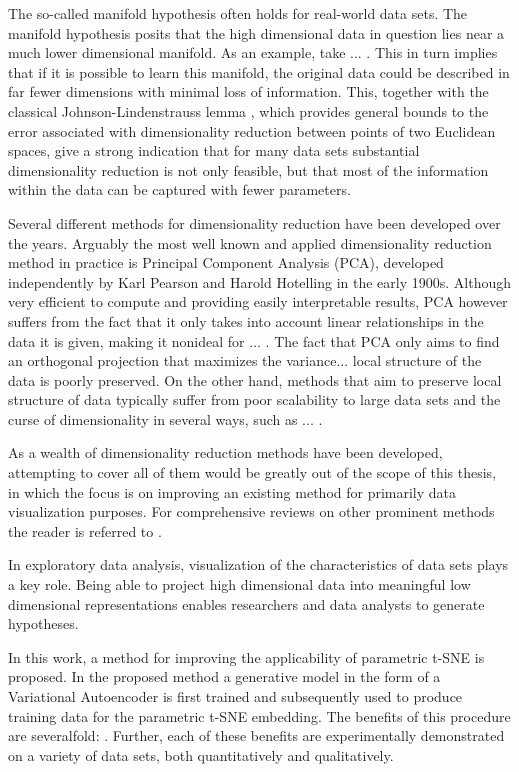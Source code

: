 The so-called manifold hypothesis \cite{manifold_hypothesis} often holds for real-world data sets. The manifold hypothesis posits that the high dimensional data in question lies near a much lower dimensional manifold. As an example, take ... . This in turn implies that if it is possible to learn this manifold, the original data could be described in far fewer dimensions with minimal loss of information. This, together with the classical Johnson-Lindenstrauss lemma \cite{johnson_lindenstrauss}, which provides general bounds to the error associated with dimensionality reduction between points of two Euclidean spaces, give a strong indication that for many data sets substantial dimensionality reduction is not only feasible, but that most of the information within the data can be captured with fewer parameters.

Several different methods for dimensionality reduction have been developed over the years. Arguably the most well known and applied dimensionality reduction method in practice is Principal Component Analysis (PCA), developed independently by Karl Pearson \cite{pca_1} and Harold Hotelling \cite{pca_2} in the early 1900s. Although very efficient to compute and providing easily interpretable results, PCA however suffers from the fact that it only takes into account linear relationships in the data it is given, making it nonideal for ... . The fact that PCA only aims to find an orthogonal projection that maximizes the variance... local structure of the data is poorly preserved. On the other hand, methods that aim to preserve local structure of data typically suffer from poor scalability to large data sets and the curse of dimensionality in several ways, such as ... .

As a wealth of dimensionality reduction methods have been developed, attempting to cover all of them would be greatly out of the scope of this thesis, in which the focus is on improving an existing method for primarily data visualization purposes. For comprehensive reviews on other prominent methods the reader is referred to \cite{first_dimensionality_reduction_review, second_dimensionality_reduction_review}.

In exploratory data analysis, visualization of the characteristics of data sets plays a key role. Being able to project high dimensional data into meaningful low dimensional representations enables researchers and data analysts to generate hypotheses.

In this work, a method for improving the applicability of parametric t-SNE is proposed. In the proposed method a generative model in the form of a Variational Autoencoder is first trained and subsequently used to produce training data for the parametric t-SNE embedding. The benefits of this procedure are severalfold: . Further, each of these benefits are experimentally demonstrated on a variety of data sets, both quantitatively and qualitatively.

